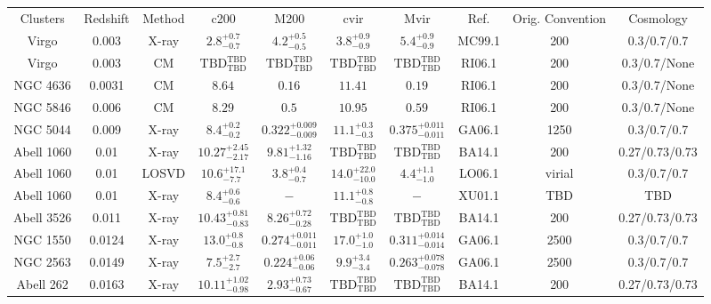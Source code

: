 \begin{table}
\begin{tabular}{cccccccccc}
Clusters & Redshift & Method & c200 & M200 & cvir & Mvir & Ref. & Orig. Convention & Cosmology \\
Virgo & 0.003 & X-ray & ${2.8}^{+0.7}_{-0.7}$ & ${4.2}^{+0.5}_{-0.5}$ & ${3.8}^{+0.9}_{-0.9}$ & ${5.4}^{+0.9}_{-0.9}$ & MC99.1 & 200 & 0.3/0.7/0.7 \\
Virgo & 0.003 & CM & ${\mathrm{TBD}}^{\mathrm{TBD}}_{\mathrm{TBD}}$ & ${\mathrm{TBD}}^{\mathrm{TBD}}_{\mathrm{TBD}}$ & ${\mathrm{TBD}}^{\mathrm{TBD}}_{\mathrm{TBD}}$ & ${\mathrm{TBD}}^{\mathrm{TBD}}_{\mathrm{TBD}}$ & RI06.1 & 200 & 0.3/0.7/None \\
NGC 4636 & 0.0031 & CM & ${8.64}^{}_{}$ & ${0.16}^{}_{}$ & ${11.41}^{}_{}$ & ${0.19}^{}_{}$ & RI06.1 & 200 & 0.3/0.7/None \\
NGC 5846 & 0.006 & CM & ${8.29}^{}_{}$ & ${0.5}^{}_{}$ & ${10.95}^{}_{}$ & ${0.59}^{}_{}$ & RI06.1 & 200 & 0.3/0.7/None \\
NGC 5044 & 0.009 & X-ray & ${8.4}^{+0.2}_{-0.2}$ & ${0.322}^{+0.009}_{-0.009}$ & ${11.1}^{+0.3}_{-0.3}$ & ${0.375}^{+0.011}_{-0.011}$ & GA06.1 & 1250 & 0.3/0.7/0.7 \\
Abell 1060 & 0.01 & X-ray & ${10.27}^{+2.45}_{-2.17}$ & ${9.81}^{+1.32}_{-1.16}$ & ${\mathrm{TBD}}^{\mathrm{TBD}}_{\mathrm{TBD}}$ & ${\mathrm{TBD}}^{\mathrm{TBD}}_{\mathrm{TBD}}$ & BA14.1 & 200 & 0.27/0.73/0.73 \\
Abell 1060 & 0.01 & LOSVD & ${10.6}^{+17.1}_{-7.7}$ & ${3.8}^{+0.4}_{-0.7}$ & ${14.0}^{+22.0}_{-10.0}$ & ${4.4}^{+1.1}_{-1.0}$ & LO06.1 & virial & 0.3/0.7/0.7 \\
Abell 1060 & 0.01 & X-ray & ${8.4}^{+0.6}_{-0.6}$ & ${-}^{}_{}$ & ${11.1}^{+0.8}_{-0.8}$ & ${-}^{}_{}$ & XU01.1 & TBD & TBD \\
Abell 3526 & 0.011 & X-ray & ${10.43}^{+0.81}_{-0.83}$ & ${8.26}^{+0.72}_{-0.28}$ & ${\mathrm{TBD}}^{\mathrm{TBD}}_{\mathrm{TBD}}$ & ${\mathrm{TBD}}^{\mathrm{TBD}}_{\mathrm{TBD}}$ & BA14.1 & 200 & 0.27/0.73/0.73 \\
NGC 1550 & 0.0124 & X-ray & ${13.0}^{+0.8}_{-0.8}$ & ${0.274}^{+0.011}_{-0.011}$ & ${17.0}^{+1.0}_{-1.0}$ & ${0.311}^{+0.014}_{-0.014}$ & GA06.1 & 2500 & 0.3/0.7/0.7 \\
NGC 2563 & 0.0149 & X-ray & ${7.5}^{+2.7}_{-2.7}$ & ${0.224}^{+0.06}_{-0.06}$ & ${9.9}^{+3.4}_{-3.4}$ & ${0.263}^{+0.078}_{-0.078}$ & GA06.1 & 2500 & 0.3/0.7/0.7 \\
Abell 262 & 0.0163 & X-ray & ${10.11}^{+1.02}_{-0.98}$ & ${2.93}^{+0.73}_{-0.67}$ & ${\mathrm{TBD}}^{\mathrm{TBD}}_{\mathrm{TBD}}$ & ${\mathrm{TBD}}^{\mathrm{TBD}}_{\mathrm{TBD}}$ & BA14.1 & 200 & 0.27/0.73/0.73 \\

\end{tabular}
\end{table}
